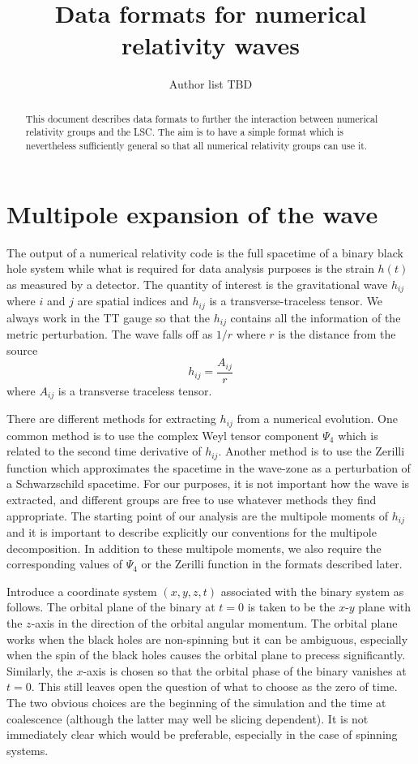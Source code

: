 \documentclass{article}
\title{Data formats for numerical relativity waves}
\date{\RCSDate}
\author{Author list TBD}
\numberwithin{equation}{section}
\begin{document}
\maketitle

\begin{abstract}
This document describes data formats to further the interaction
between numerical relativity groups and the LSC. The aim is to have a
simple format which is nevertheless sufficiently general so that all
numerical relativity groups can use it.  
\end{abstract}

\section{Multipole expansion of the wave}
\label{sec:multipoles}

The output of a numerical relativity code is the full spacetime of a
binary black hole system while what is required for data analysis
purposes is the strain $h(t)$ as measured by a detector.  The quantity
of interest is the gravitational wave $h_{ij}$ where $i$ and $j$ are
spatial indices and $h_{ij}$ is a transverse-traceless tensor.  We
always work in the TT gauge so that the $h_{ij}$ contains all the
information of the metric perturbation.  The wave falls off as $1/r$
where $r$ is the distance from the source
\begin{equation}
  \label{eq:1}
  h_{ij} = \frac{A_{ij}}{r} 
\end{equation}
where $A_{ij}$ is a transverse traceless tensor.  

There are different methods for extracting $h_{ij}$ from a numerical
evolution.  One common method is to use the complex Weyl tensor
component $\Psi_4$ which is related to the second time derivative of
$h_{ij}$. Another method is to use the Zerilli function which
approximates the spacetime in the wave-zone as a perturbation of a
Schwarzschild spacetime.  For our purposes, it is not important how
the wave is extracted, and different groups are free to use whatever
methods they find appropriate.  The starting point of our analysis are
the multipole moments of $h_{ij}$ and it is important to describe
explicitly our conventions for the multipole decomposition.  In
addition to these multipole moments, we also require the corresponding
values of $\Psi_4$ or the Zerilli function in the formats described
later. 


Introduce a coordinate system $(x,y,z,t)$ associated with the binary
system as follows.  The orbital plane of the binary at $t=0$ is taken to
be the $x$-$y$ plane with the $z$-axis in the direction of the orbital
angular momentum.  The orbital plane works when the black holes are
non-spinning but it can be ambiguous, especially when the spin of the
black holes causes the orbital plane to precess significantly.
Similarly, the $x$-axis is chosen so that the orbital phase of the
binary vanishes at $t=0$.   This still leaves open the question of what
to choose as the zero of time.  The two obvious choices are the
beginning of the simulation and the time at coalescence (although the
latter may well be slicing dependent).  It is not immediately clear
which would be preferable, especially in the case of spinning systems.
\end{document}
